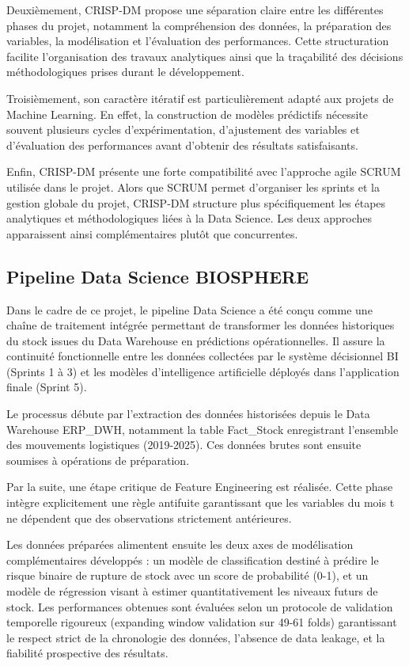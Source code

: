 Deuxièmement, CRISP-DM propose une séparation claire entre les différentes phases du projet, notamment la compréhension des données, la préparation des variables, la modélisation et l'évaluation des performances. Cette structuration facilite l'organisation des travaux analytiques ainsi que la traçabilité des décisions méthodologiques prises durant le développement.
 
Troisièmement, son caractère itératif est particulièrement adapté aux projets de Machine Learning. En effet, la construction de modèles prédictifs nécessite souvent plusieurs cycles d'expérimentation, d'ajustement des variables et d'évaluation des performances avant d'obtenir des résultats satisfaisants.
 
Enfin, CRISP-DM présente une forte compatibilité avec l'approche agile SCRUM utilisée dans le projet. Alors que SCRUM permet d'organiser les sprints et la gestion globale du projet, CRISP-DM structure plus spécifiquement les étapes analytiques et méthodologiques liées à la Data Science. Les deux approches apparaissent ainsi complémentaires plutôt que concurrentes.
 
\subsection{Pipeline Data Science BIOSPHERE}
 
Dans le cadre de ce projet, le pipeline Data Science a été conçu comme une chaîne de traitement intégrée permettant de transformer les données historiques du stock issues du Data Warehouse en prédictions opérationnelles. Il assure la continuité fonctionnelle entre les données collectées par le système décisionnel BI (Sprints 1 à 3) et les modèles d'intelligence artificielle déployés dans l'application finale (Sprint 5).
 
Le processus débute par l'extraction des données historisées depuis le Data Warehouse ERP\_DWH, notamment la table Fact\_Stock enregistrant l'ensemble des mouvements logistiques (2019-2025). Ces données brutes sont ensuite soumises à opérations de préparation.
 
Par la suite, une étape critique de Feature Engineering est réalisée. Cette phase intègre explicitement une règle antifuite garantissant que les variables du mois t ne dépendent que des observations strictement antérieures.
 
Les données préparées alimentent ensuite les deux axes de modélisation complémentaires développés : un modèle de classification destiné à prédire le risque binaire de rupture de stock avec un score de probabilité (0-1), et un modèle de régression visant à estimer quantitativement les niveaux futurs de stock. Les performances obtenues sont évaluées selon un protocole de validation temporelle rigoureux (expanding window validation sur 49-61 folds) garantissant le respect strict de la chronologie des données, l'absence de data leakage, et la fiabilité prospective des résultats.
 
